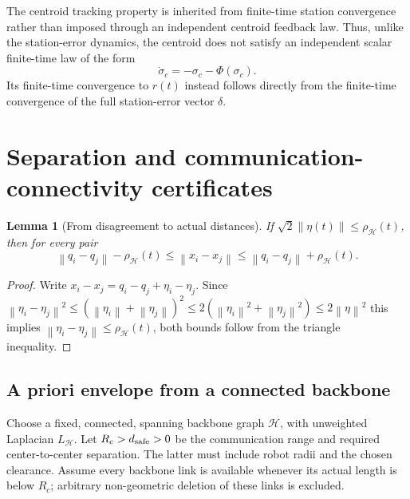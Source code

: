\documentclass[11pt,a4paper]{article}
\newtheorem{lemma}{Lemma}
\theoremstyle{remark}
\newcommand{\norm}[1]{\left\lVert#1\right\rVert}
\begin{document}
The centroid tracking property is inherited from finite-time station convergence rather than imposed through an independent centroid feedback law. 
Thus, unlike the station-error dynamics, the centroid does not satisfy an independent scalar finite-time law of the form
\begin{equation}
\dot\sigma_c=-\sigma_c-\Phi(\sigma_c).
\end{equation}
Its finite-time convergence to $r(t)$ instead follows directly from the finite-time convergence of the full station-error vector $\delta$.

\section{Separation and communication-connectivity certificates}

\begin{lemma}[From disagreement to actual distances]
If $\sqrt{2}\norm{\eta(t)}\le \rho_{\mathcal H}(t)$, then for every pair
\begin{equation}
\norm{q_i-q_j}-\rho_{\mathcal H}(t)
\le\norm{x_i-x_j}
\le\norm{q_i-q_j}+\rho_{\mathcal H}(t).
\label{eq:distance-tube}
\end{equation}
\end{lemma}
\begin{proof}
Write $x_i-x_j=q_i-q_j+\eta_i-\eta_j$. Since
$\norm{\eta_i-\eta_j}^2 \le (\norm{\eta_i}+\norm{\eta_j})^2 \le2(\norm{\eta_i}^2+\norm{\eta_j}^2)
\le2\norm{\eta}^2$ this implies $\norm{\eta_i-\eta_j} \le \rho_{\mathcal H}(t)$, both bounds follow from the triangle inequality.
\end{proof}

\subsection*{A priori envelope from a connected backbone}
Choose a fixed, connected, spanning backbone graph $\mathcal H$, with unweighted Laplacian $L_{\mathcal H}$. Let $R_c>d_{\rm safe}>0$ be the communication range and required center-to-center separation. The latter must include robot radii and the chosen clearance. Assume every backbone link is available whenever its actual length is below $R_c$; arbitrary non-geometric deletion of these links is excluded.
\end{document}
